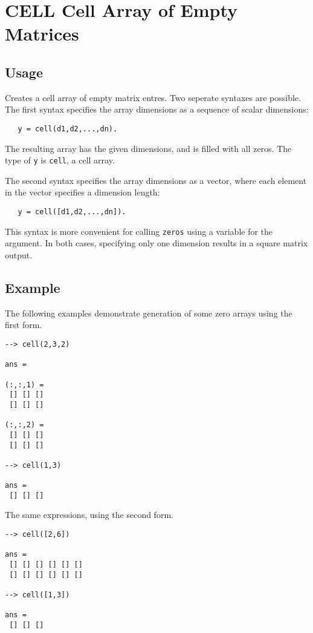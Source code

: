 \section{CELL Cell Array of Empty Matrices}

\subsection{Usage}

Creates a cell array of empty matrix entres.  Two seperate 
syntaxes are possible.  The first syntax specifies the array 
dimensions as a sequence of scalar dimensions:
\begin{verbatim}
   y = cell(d1,d2,...,dn).
\end{verbatim}
The resulting array has the given dimensions, and is filled with
all zeros.  The type of \verb|y| is \verb|cell|, a cell array.  
    
The second syntax specifies the array dimensions as a vector,
where each element in the vector specifies a dimension length:
\begin{verbatim}
   y = cell([d1,d2,...,dn]).
\end{verbatim}
This syntax is more convenient for calling \verb|zeros| using a 
variable for the argument.  In both cases, specifying only one
dimension results in a square matrix output.
\subsection{Example}

The following examples demonstrate generation of some zero arrays 
using the first form.
\begin{verbatim}
--> cell(2,3,2)

ans = 

(:,:,1) = 
 [] [] [] 
 [] [] [] 

(:,:,2) = 
 [] [] [] 
 [] [] [] 

--> cell(1,3)

ans = 
 [] [] [] 
\end{verbatim}
The same expressions, using the second form.
\begin{verbatim}
--> cell([2,6])

ans = 
 [] [] [] [] [] [] 
 [] [] [] [] [] [] 

--> cell([1,3])

ans = 
 [] [] [] 
\end{verbatim}
